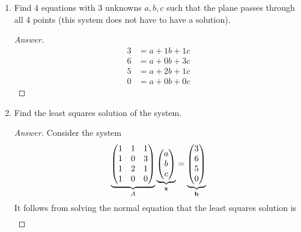 \documentclass[../psets.tex]{subfiles}
\begin{document}
\begin{enumerate}[label={\textbf{4.\arabic*.}}]
    \begin{enumerate}
        \item Find 4 equations with 3 unknowns $a,b,c$ such that the plane passes through all 4 points (this system does not have to have a solution).
        \begin{proof}[Answer]
            \begin{align*}
                3 &= a+1b+1c\\
                6 &= a+0b+3c\\
                5 &= a+2b+1c\\
                0 &= a+0b+0c
            \end{align*}
        \end{proof}
        \item Find the least squares solution of the system.
        \begin{proof}[Answer]
            Consider the system
            \begin{equation*}
                \underbrace{
                    \begin{pmatrix}
                        1 & 1 & 1\\
                        1 & 0 & 3\\
                        1 & 2 & 1\\
                        1 & 0 & 0\\
                    \end{pmatrix}
                }_A\underbrace{
                    \begin{pmatrix}
                        a\\
                        b\\
                        c\\
                    \end{pmatrix}
                }_{\mathbf{x}}=\underbrace{
                    \begin{pmatrix}
                        3\\
                        6\\
                        5\\
                        0\\
                    \end{pmatrix}
                }_{\mathbf{b}}
            \end{equation*}
            It follows from solving the normal equation that the least squares solution is
            \begin{align*}

\end{align*}
\end{proof}
\end{enumerate}
\end{enumerate}
\end{document}
